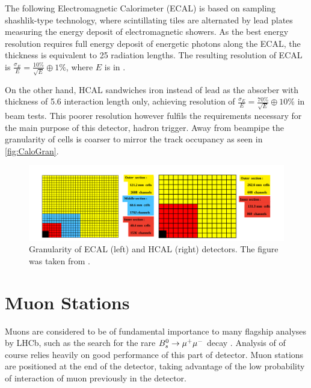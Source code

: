 The following Electromagnetic Calorimeter (\Gls{ECAL}) is based on sampling shashlik-type technology, where scintillating tiles are alternated by lead plates measuring the energy deposit of electromagnetic showers. As the best energy resolution requires full energy deposit of energetic photons along the \Gls{ECAL}, the thickness is equivalent to 25 radiation lengths. The resulting resolution of \Gls{ECAL} is $\frac{\sigma_{E}}{E} = \frac{10\%}{\sqrt{E}} \oplus 1\%$, where $E$ is in \gev.

On the other hand, \Gls{HCAL} sandwiches iron instead of lead as the absorber with thickness of 5.6 interaction length only, achieving resolution of $\frac{\sigma_{E}}{E} = \frac{70\%}{\sqrt{E}} \oplus 10\%$ in beam tests. This poorer resolution however fulfils the requirements necessary for the main purpose of this detector, hadron trigger. Away from beampipe the granularity of cells is coarser to mirror the track occupancy as seen in \autoref{fig:CaloGran}. 

\begin{figure}[!h]
	\centering
	\includegraphics[width = 1.0\textwidth]{figs/detector/CaloGran.png}%
	\caption{Granularity of \Gls{ECAL} (left) and \Gls{HCAL} (right) detectors. The figure was taken from \cite{det_paper}. }  
	\label{fig:CaloGran}
\end{figure}




\section{Muon Stations }
Muons are considered to be of fundamental importance to many flagship analyses by \Gls{LHCb}, such as the search for the rare ${B}^{0}_{s} \rightarrow \mu^{+} \mu^{-}$ decay . Analysis of \Bmumumu of course relies heavily on good performance of this part of detector. Muon stations are positioned at the end of the detector, taking advantage of the low probability of interaction of muon previously in the detector.


